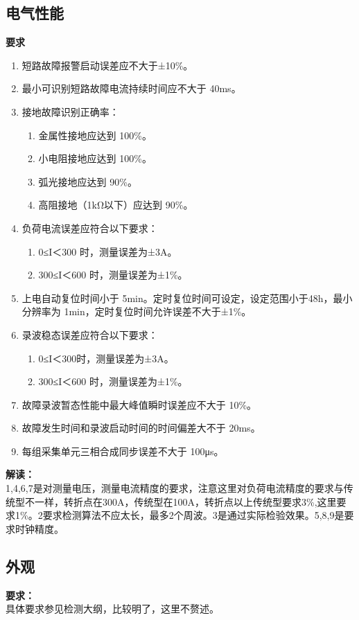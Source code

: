 \documentclass{article}
\begin{document}
\begin{CJK}{UTF8}{gbsn}
\subsection{ 电气性能		}
		\par
		\textbf{要求}
			\begin{enumerate}
				\item 短路故障报警启动误差应不大于±10\%。 
				\item 最小可识别短路故障电流持续时间应不大于 40ms。 
				\item 接地故障识别正确率： 
					\begin{enumerate}
						\item 金属性接地应达到 100\%。 
				    	\item 小电阻接地应达到 100\%。 
				    	\item 弧光接地应达到 90\%。 
				    	\item 高阻接地（1kΩ以下）应达到 90\%。 
					\end{enumerate}
				\item 负荷电流误差应符合以下要求：
					\begin{enumerate}
						\item  0≤I＜300 时，测量误差为±3A。 
				    	\item 300≤I＜600 时，测量误差为±1\%。 
					\end{enumerate}
				\item 上电自动复位时间小于 5min。定时复位时间可设定，设定范围小于48h，最小分辨率为 1min，定时复位时间允许误差不大于±1\%。 
				\item 录波稳态误差应符合以下要求： 
					\begin{enumerate}	
						\item 0≤I＜300时，测量误差为±3A。 
						\item 300≤I＜600 时，测量误差为±1\%。 
					\end{enumerate}
				\item 故障录波暂态性能中最大峰值瞬时误差应不大于 10\%。 
				\item 故障发生时间和录波启动时间的时间偏差大不于 20ms。 
				\item 每组采集单元三相合成同步误差不大于 100μs。 
		\end{enumerate}
		\textbf{解读：}\\
		1,4,6,7是对测量电压，测量电流精度的要求，注意这里对负荷电流精度的要求与传统型不一样，转折点在300A，传统型在100A，转折点以上传统型要求3\%,这里要求1\%。2要求检测算法不应太长，最多2个周波。3是通过实际检验效果。5,8,9是要求时钟精度。
\subsection{ 外观 }
	\par
	\textbf{要求：}\\
	具体要求参见检测大纲，比较明了，这里不赘述。


\end{CJK}
\end{document}
